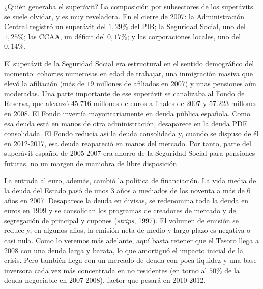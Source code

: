 \documentclass[10pt,a4paper]{article}
\begin{document}
¿Quién generaba el superávit? La composición por subsectores de los superávits se suele olvidar, y es muy reveladora. En el cierre de 2007: la Administración Central registró un superávit del $1,29\%$ del PIB; la Seguridad Social, uno del $1,25\%$; las CCAA, un déficit del $0,17\%$; y las corporaciones locales, uno del $0,14\%$.

El superávit de la Seguridad Social era estructural en el sentido demográfico del momento: cohortes numerosas en edad de trabajar, una inmigración masiva que elevó la afiliación (más de $19$ millones de afiliados en 2007) y unas pensiones aún moderadas. Una parte importante de ese superávit se canalizaba al Fondo de Reserva, que alcanzó $45.716$ millones de euros a finales de 2007 y $57.223$ millones en 2008. El Fondo invertía mayoritariamente en deuda pública española. Como esa deuda está en manos de otra administración, desaparece en la deuda PDE consolidada. El Fondo reducía así la deuda consolidada y, cuando se dispuso de él en 2012-2017, esa deuda reapareció en manos del mercado. Por tanto, parte del superávit español de 2005-2007 era ahorro de la Seguridad Social para pensiones futuras, no un margen de maniobra de libre disposición. 

La entrada al euro, además, cambió la política de financiación. La vida media de la deuda del Estado pasó de unos $3$ años a mediados de los noventa a más de $6$ años en 2007. Desaparece la deuda en divisas, se redenomina toda la deuda en euros en 1999 y se consolidan los programas de creadores de mercado y de segregación de principal y cupones (\textit{strips}, 1997). El volumen de emisión se reduce y, en algunos años, la emisión neta de medio y largo plazo es negativa o casi nula. Como lo veremos más adelante, aquí basta retener que el Tesoro llega a 2008 con una deuda larga y barata, lo que amortiguó el impacto inicial de la crisis. Pero también llega con un mercado de deuda con poca liquidez y una base inversora cada vez más concentrada en no residentes (en torno al $50\%$ de la deuda negociable en 2007-2008), factor que pesará en 2010-2012.
\end{document}
